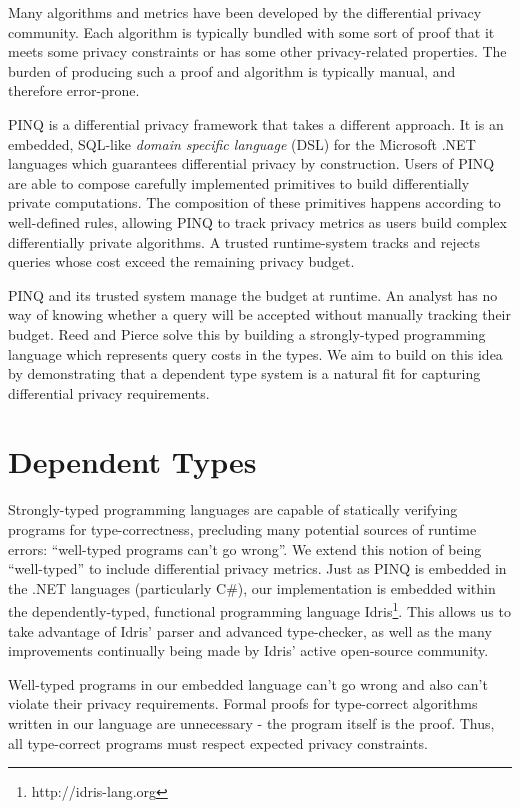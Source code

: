 \documentclass[12pt]{report}
\begin{document}
Many algorithms and metrics have been developed by the differential privacy community.
Each algorithm is typically bundled with some sort of proof that it meets some privacy constraints or has some other privacy-related properties.
The burden of producing such a proof and algorithm is typically manual, and therefore error-prone.

PINQ is a differential privacy framework that takes a different approach\cite{mcsherry2010privacy}.
It is an embedded, SQL-like \textit{domain specific language} (DSL) for the Microsoft .NET languages which guarantees differential privacy by construction.
Users of PINQ are able to compose carefully implemented primitives to build differentially private computations.
The composition of these primitives happens according to well-defined rules, allowing PINQ to track privacy metrics as users build complex differentially private algorithms.
A trusted runtime-system tracks and rejects queries whose cost exceed the remaining privacy budget.

PINQ and its trusted system manage the budget at runtime.
An analyst has no way of knowing whether a query will be accepted without manually tracking their budget.
Reed and Pierce solve this by building a strongly-typed programming language which represents query costs in the types\cite{conf/icfp/ReedP10}.
We aim to build on this idea by demonstrating that a dependent type system is a natural fit for capturing differential privacy requirements.

\section{Dependent Types}\label{sec:intro-deptyps}

Strongly-typed programming languages are capable of statically verifying programs for type-correctness, precluding many potential sources of runtime errors: ``well-typed programs can't go wrong''.
We extend this notion of being ``well-typed'' to include differential privacy metrics.
Just as PINQ is embedded in the .NET languages (particularly C\#), our implementation is embedded within the dependently-typed, functional programming language Idris\footnote{http://idris-lang.org}.
This allows us to take advantage of Idris' parser and advanced type-checker, as well as the many improvements continually being made by Idris' active open-source community.

Well-typed programs in our embedded language can't go wrong and also can't violate their privacy requirements.
Formal proofs for type-correct algorithms written in our language are unnecessary - the program itself is the proof.
Thus, all type-correct programs must respect expected privacy constraints.
\end{document}
